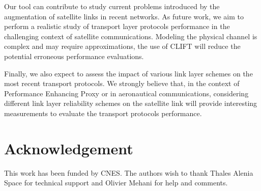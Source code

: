 \documentclass[conference,letterpaper]{IEEEtran}
\begin{document}
Our tool can contribute to study current problems introduced by the augmentation of satellite links in recent networks. As future work,  we aim to perform a realistic study of transport layer protocols performance in the challenging context of satellite communications. Modeling the physical channel is complex and may require approximations, the use of CLIFT will reduce the potential erroneous performance evaluations. 

Finally, we also expect to assess the impact of various link layer schemes on the most recent transport protocols. We strongly believe that, in the context of Performance Enhancing Proxy\cite{pep_1,pep_2} or in aeronautical communications, considering different link layer reliability schemes on the satellite link will provide interesting measurements to evaluate the transport protocols performance. 

\section*{Acknowledgement}
This work has been funded by CNES. The authors wish to thank Thales Alenia Space for technical support and Olivier Mehani for help and comments.
\end{document}
